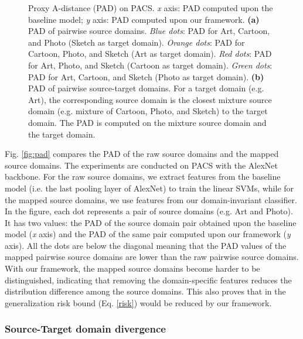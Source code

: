 \documentclass{article}
\begin{document}
\begin{figure*}[ht]
\centering
{}
\hfil
{}
\caption{Proxy A-distance (PAD) on PACS. \textit{x} axis: PAD computed upon the baseline model; \textit{y} axis: PAD computed upon our framework. \textbf{(a)} PAD of pairwise source domains. \textit{Blue dots}: PAD for Art, Cartoon, and Photo (Sketch as target domain). \textit{Orange dots}: PAD for Cartoon, Photo, and Sketch (Art as target domain). \textit{Red dots}: PAD for Art, Photo, and Sketch (Cartoon as target domain). \textit{Green dots}: PAD for Art, Cartoon, and Sketch (Photo as target domain). \textbf{(b)} PAD of pairwise source-target domains. For a target domain (e.g. Art), the corresponding source domain is the closest mixture source domain (e.g. mixture of Cartoon, Photo, and Sketch) to the target domain. The PAD is computed on the mixture source domain and the target domain.}
\label{fig:pads}
\end{figure*}
Fig. \ref{fig:pad} compares the PAD of the raw source domains and the mapped source domains. The experiments are conducted on PACS with the AlexNet backbone. For the raw source domains, we extract features from the baseline model (i.e. the last pooling layer of AlexNet) to train the linear SVMs, while for the mapped source domains, we use features from our domain-invariant classifier. In the figure, each dot represents a pair of source domains (e.g. Art and Photo). It has two values: the PAD of the source domain pair obtained upon the baseline model (\textit{x} axis) and the PAD of the same pair computed upon our framework (\textit{y} axis). All the dots are below the diagonal meaning that the PAD values of the mapped pairwise source domains are lower than the raw pairwise source domains. With our framework, the mapped source domains become harder to be distinguished, indicating that removing the domain-specific features reduces the distribution difference among the source domains. This also proves that  in the generalization risk bound (Eq. \ref{risk}) would be reduced by our framework.

\subsubsection{Source-Target domain divergence}
\end{document}

